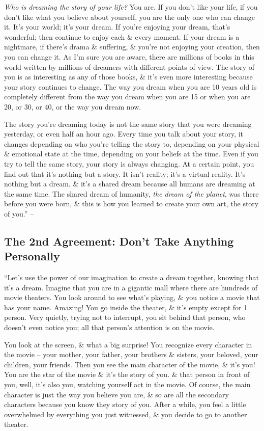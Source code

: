 \documentclass{article}
\numberwithin{equation}{section}
\begin{document}
\textit{Who is dreaming the story of your life?} You are. If you don't like your life, if you don't like what you believe about yourself, you are the only one who can change it. It's your world; it's your dream. If you're enjoying your dream, that's wonderful; then continue to enjoy each \& every moment. If your dream is a nightmare, if there's drama \& suffering, \& you're not enjoying your creation, then you can change it. As I'm sure you are aware, there are millions of books in this world written by millions of dreamers with different points of view. The story of you is as interesting as any of those books, \& it's even more interesting because your story continues to change. The way you dream when you are 10 years old is completely different from the way you dream when you are 15 or when you are 20, or 30, or 40, or the way you dream now.

The story you're dreaming today is not the same story that you were dreaming yesterday, or even half an hour ago. Every time you talk about your story, it changes depending on who you're telling the story to, depending on your physical \& emotional state at the time, depending on your beliefs at the time. Even if you try to tell the same story, your story is always changing. At a certain point, you find out that it's nothing but a story. It isn't reality; it's a virtual reality. It's nothing but a dream. \& it's a shared dream because all humans are dreaming at the same time. The shared dream of humanity, \textit{the dream of the planet}, was there before you were born, \& this is how you learned to create your own art, the story of you.'' -- \cite[pp. 43--45]{Ruiz_Ruiz2011}

\subsection{The 2nd Agreement: Don't Take Anything Personally}
``Let's use the power of our imagination to create a dream together, knowing that it's a dream. Imagine that you are in a gigantic mall where there are hundreds of movie theaters. You look around to see what's playing, \& you notice a movie that has your name. Amazing! You go inside the theater, \& it's empty except for 1 person. Very quietly, trying not to interrupt, you sit behind that person, who doesn't even notice you; all that person's attention is on the movie.

You look at the screen, \& what a big surprise! You recognize every character in the movie -- your mother, your father, your brothers \& sisters, your beloved, your children, your friends. Then you see the main character of the movie, \& it's you! You are the star of the movie \& it's the story of you. \& that person in front of you, well, it's also you, watching yourself act in the movie. Of course, the main character is just the way you believe you are, \& so are all the secondary characters because you know they story of you. After a while, you feel a little overwhelmed by everything you just witnessed, \& you decide to go to another theater.
\end{document}
